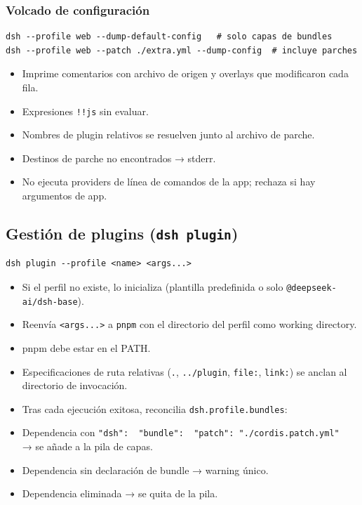 \documentclass[11pt,a4paper]{article}
\begin{document}
\subsubsection*{Volcado de configuración}


\begin{lstlisting}
dsh --profile web --dump-default-config   # solo capas de bundles
dsh --profile web --patch ./extra.yml --dump-config  # incluye parches
\end{lstlisting}


\begin{itemize}[leftmargin=*,topsep=2pt,itemsep=1pt]
  \item Imprime comentarios con archivo de origen y overlays que modificaron cada fila.
  \item Expresiones \texttt{!!js} sin evaluar.
  \item Nombres de plugin relativos se resuelven junto al archivo de parche.
  \item Destinos de parche no encontrados → stderr.
  \item No ejecuta providers de línea de comandos de la app; rechaza si hay argumentos de app.
\end{itemize}


\subsection*{Gestión de plugins (\texttt{dsh plugin})}


\begin{lstlisting}
dsh plugin --profile <name> <args...>
\end{lstlisting}


\begin{itemize}[leftmargin=*,topsep=2pt,itemsep=1pt]
  \item Si el perfil no existe, lo inicializa (plantilla predefinida o solo \texttt{@deepseek-ai/dsh-base}).
  \item Reenvía \texttt{<args...>} a \texttt{pnpm} con el directorio del perfil como working directory.
  \item pnpm debe estar en el PATH.
  \item Especificaciones de ruta relativas (\texttt{.}, \texttt{../plugin}, \texttt{file:}, \texttt{link:}) se anclan al directorio de invocación.
  \item Tras cada ejecución exitosa, reconcilia \texttt{dsh.profile.bundles}:
  \item Dependencia con \texttt{"dsh": { "bundle": { "patch": "./cordis.patch.yml" } }} → se añade a la pila de capas.
  \item Dependencia sin declaración de bundle → warning único.
  \item Dependencia eliminada → se quita de la pila.
\end{itemize}
\end{document}
